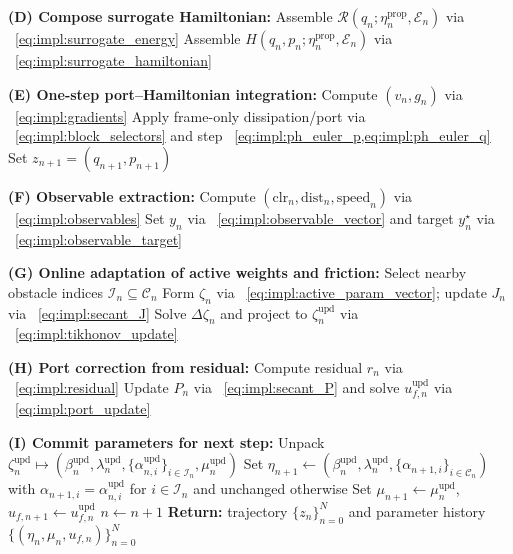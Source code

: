 \begin{algorithm}[htbp]
\begin{algorithmic}[1]
    \State \textbf{(D) Compose surrogate Hamiltonian:} 
    \Statex \hspace{1em} Assemble $\mathcal{R}(q_n;\eta_n^{\mathrm{prop}},\mathcal{E}_n)$ via ~\cref{eq:impl:surrogate_energy}
    \Statex \hspace{1em} Assemble $H(q_n,p_n;\eta_n^{\mathrm{prop}},\mathcal{E}_n)$ via ~\cref{eq:impl:surrogate_hamiltonian}

    \State \textbf{(E) One-step port--Hamiltonian integration:}
    \State Compute $(v_n,g_n)$ via ~\cref{eq:impl:gradients}
    \State Apply frame-only dissipation/port via ~\cref{eq:impl:block_selectors} and step ~\cref{eq:impl:ph_euler_p,eq:impl:ph_euler_q}
    \State Set $z_{n+1}=(q_{n+1},p_{n+1})$

    \State \textbf{(F) Observable extraction:} 
    \State Compute $(\mathrm{clr}_n,\mathrm{dist}_n,\mathrm{speed}_n)$ via ~\cref{eq:impl:observables}
    \State Set $y_n$ via ~\cref{eq:impl:observable_vector} and target $y_n^\star$ via ~\cref{eq:impl:observable_target}

    \State \textbf{(G) Online adaptation of active weights and friction:}
    \State Select nearby obstacle indices $\mathcal{I}_n \subseteq \mathcal{C}_n$
    \State Form $\zeta_n$ via ~\cref{eq:impl:active_param_vector}; update $J_n$ via ~\cref{eq:impl:secant_J}
    \State Solve $\Delta\zeta_n$ and project to $\zeta_n^{\mathrm{upd}}$ via ~\cref{eq:impl:tikhonov_update}

    \State \textbf{(H) Port correction from residual:}
    \State Compute residual $r_n$ via ~\cref{eq:impl:residual}
    \State Update $P_n$ via ~\cref{eq:impl:secant_P} and solve $u_{f,n}^{\mathrm{upd}}$ via ~\cref{eq:impl:port_update}

    \State \textbf{(I) Commit parameters for next step:}
    \State Unpack $\zeta_n^{\mathrm{upd}}\mapsto(\beta_n^{\mathrm{upd}},\lambda_n^{\mathrm{upd}},\{\alpha_{n,i}^{\mathrm{upd}}\}_{i\in\mathcal{I}_n},\mu_n^{\mathrm{upd}})$
    \State Set $\eta_{n+1}\leftarrow(\beta_n^{\mathrm{upd}},\lambda_n^{\mathrm{upd}},\{\alpha_{n+1,i}\}_{i\in\mathcal{C}_n})$ with $\alpha_{n+1,i}{=}\alpha_{n,i}^{\mathrm{upd}}$ for $i\in\mathcal{I}_n$ and unchanged otherwise
    \State Set $\mu_{n+1}\leftarrow \mu_n^{\mathrm{upd}}$, \quad $u_{f,n+1}\leftarrow u_{f,n}^{\mathrm{upd}}$
    \State $n\leftarrow n+1$
\EndWhile
\State \textbf{Return:} trajectory $\{z_n\}_{n=0}^{N}$ and parameter history $\{(\eta_n,\mu_n,u_{f,n})\}_{n=0}^{N}$
\end{algorithmic}
\end{algorithm}

